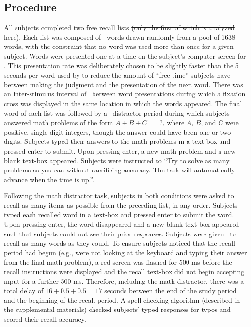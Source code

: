 \documentclass[man,natbib,floatsintext]{apa6} %
\begin{document}
\subsection{Procedure}
All subjects completed two free recall lists \st{(only the first of which is analyzed here)}. Each list was composed of \listlength~words drawn randomly from a pool of 1638 words, with the constraint that no word was used more than once for a given subject. Words were presented one at a time on the subject's computer screen for \presrate. This presentation rate was deliberately chosen to be slightly faster than the 5 seconds per word used by \citet{NairEtal17} to reduce the amount of ``free time'' subjects have between making the judgment and the presentation of the next word.
There was an inter-stimulus interval of \isi~between word presentations during which a fixation cross was displayed in the same location in which the words appeared. The final word of each list was followed by a \DFRDelay~distractor period during which subjects answered math problems of the form $A+B+C=$~?, where $A$, $B$, and $C$ were positive, single-digit integers, though the answer could have been one or two digits. Subjects typed their answers to the math problems in a text-box and pressed enter to submit. Upon pressing enter, a new math problem and a new blank text-box appeared. Subjects were instructed to ``Try to solve as many problems as you can without sacrificing accuracy. The task will automatically advance when the time is up.''.

Following the math distractor task, subjects in both conditions were asked to recall as many items as possible from the preceding list, in any order. Subjects typed each recalled word in a text-box and pressed enter to submit the word. Upon pressing enter, the word disappeared and a new blank text-box appeared such that subjects could not see their prior responses. Subjects were given \recalltime~to recall as many words as they could. To ensure subjects noticed that the recall period had begun (e.g., were not looking at the keyboard and typing their answer from the final math problem), a red screen was flashed for 500 ms before the recall instructions were displayed and the recall text-box did not begin accepting input for a further 500 ms. Therefore, including the math distractor, there was a total delay of $16+0.5+0.5=17$ seconds between the end of the study period and the beginning of the recall period. A spell-checking algorithm (described in the supplemental materials) checked subjects' typed responses for typos and scored their recall accuracy.
\end{document}
